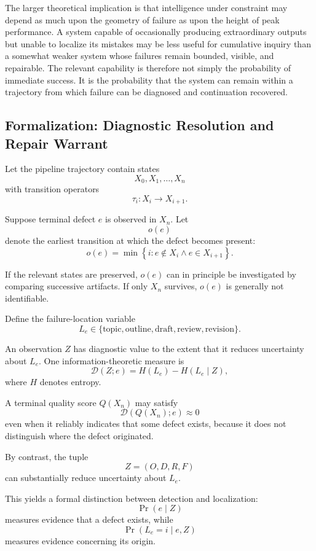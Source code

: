 \documentclass[11pt]{article}
\begin{document}
The larger theoretical implication is that intelligence under constraint may depend as much upon the geometry of failure as upon the height of peak performance. A system capable of occasionally producing extraordinary outputs but unable to localize its mistakes may be less useful for cumulative inquiry than a somewhat weaker system whose failures remain bounded, visible, and repairable. The relevant capability is therefore not simply the probability of immediate success. It is the probability that the system can remain within a trajectory from which failure can be diagnosed and continuation recovered.

\subsection{Formalization: Diagnostic Resolution and Repair Warrant}

Let the pipeline trajectory contain states
\[
    X_0,X_1,\ldots,X_n
\]
with transition operators
\[
    \tau_i:X_i\rightarrow X_{i+1}.
\]

Suppose terminal defect \(e\) is observed in \(X_n\). Let
\[
    o(e)
\]
denote the earliest transition at which the defect becomes present:
\[
    o(e)
    =
    \min
    \left\{
        i:
        e\notin X_i
        \land
        e\in X_{i+1}
    \right\}.
\]

If the relevant states are preserved, \(o(e)\) can in principle be investigated by comparing successive artifacts. If only \(X_n\) survives, \(o(e)\) is generally not identifiable.

Define the failure-location variable
\[
    L_e\in
    \{
        \text{topic},
        \text{outline},
        \text{draft},
        \text{review},
        \text{revision}
    \}.
\]

An observation \(Z\) has diagnostic value to the extent that it reduces uncertainty about \(L_e\). One information-theoretic measure is
\[
    \mathcal{D}(Z;e)
    =
    H(L_e)-H(L_e\mid Z),
\]
where \(H\) denotes entropy.

A terminal quality score \(Q(X_n)\) may satisfy
\[
    \mathcal{D}(Q(X_n);e)\approx0
\]
even when it reliably indicates that some defect exists, because it does not distinguish where the defect originated.

By contrast, the tuple
\[
    Z=
    (O,D,R,F)
\]
can substantially reduce uncertainty about \(L_e\).

This yields a formal distinction between detection and localization:
\[
    \Pr(e\mid Z)
\]
measures evidence that a defect exists, while
\[
    \Pr(L_e=i\mid e,Z)
\]
measures evidence concerning its origin.
\end{document}
